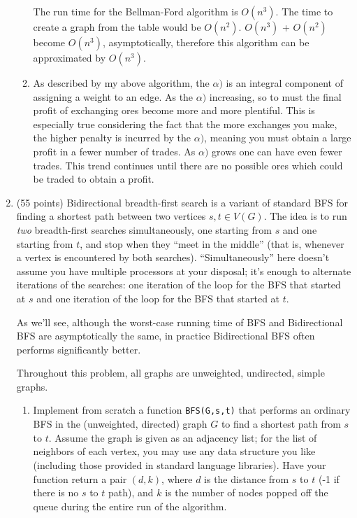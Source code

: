 \documentclass[12pt]{article}
\begin{document}
\begin{enumerate}
\begin{enumerate}
    The run time for the Bellman-Ford algorithm is $O(n^{3})$. The time to create a graph from the table would be $O(n^{2})$. $O(n^{3})$ + $O(n^{2})$ become $O(n^{3})$, asymptotically, therefore this algorithm can be approximated by $O(n^{3})$.
    \newline \smallskip
    \item
    As described by my above algorithm, the $\alpha)$ is an integral component of assigning a weight to an edge. As the $\alpha)$ increasing, so to must the final profit of exchanging ores become more and more plentiful. This is especially true considering the fact that the more exchanges you make, the higher penalty is incurred by the $\alpha)$, meaning you must obtain a large profit in a fewer number of trades. As $\alpha)$ grows one can have even fewer trades. This trend continues until there are no possible ores which could be traded to obtain a profit.
\end{enumerate}
 \pagebreak

	\item (55 points) Bidirectional breadth-first search is a variant of standard BFS for finding a shortest path between two vertices $s,t \in V(G)$. The idea is to run \emph{two} breadth-first searches simultaneously, one starting from $s$ and one starting from $t$, and stop when they ``meet in the middle'' (that is, whenever a vertex is encountered by both searches). ``Simultaneously'' here doesn't assume you have multiple processors at your disposal; it's enough to alternate iterations of the searches: one iteration of the loop for the BFS that started at $s$ and one iteration of the loop for the BFS that started at $t$.
	
	As we'll see, although the worst-case running time of BFS and Bidirectional BFS are asymptotically the same, in practice Bidirectional BFS often performs significantly better.
	
	Throughout this problem, all graphs are unweighted, undirected, simple graphs.
	
	\begin{enumerate}
	
	\item Implement from scratch a function \texttt{BFS(G,s,t)} that performs an ordinary BFS in the (unweighted, directed) graph $G$ to find a shortest path from $s$ to $t$. Assume the graph is given as an adjacency list; for the list of neighbors of each vertex, you may use any data structure you like (including those provided in standard language libraries). Have your function return a pair $(d,k)$, where $d$ is the distance from $s$ to $t$ (-1 if there is no $s$ to $t$ path), and $k$ is the number of nodes popped off the queue during the entire run of the algorithm.
	

\end{enumerate}
\end{enumerate}
\end{document}
